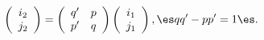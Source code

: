 \begin{equation}
\left(
 \begin{array}{c}
   {i_2}\\
   {j_2}
 \end{array}
\right)
=
\left(
 \begin{array}{cc}
   {q^\prime} & p \\
   {p^\prime} & q 
 \end{array}
\right)
\left(
 \begin{array}{c}
   {i_1}\\
   {j_1}
 \end{array}
\right), \es
q q^\prime - p p^\prime = 1 \es.
\label{eq:SL2Z}
\end{equation}

